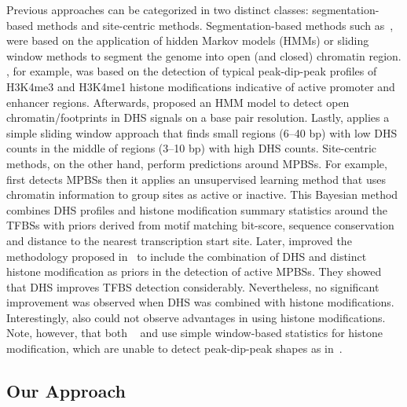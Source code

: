 \documentclass{bioinfo}
\begin{document}
Previous approaches can be categorized in two distinct classes: segmentation-based
methods and site-centric methods. Segmentation-based methods such as~\cite{boyle2011,neph2012a,won2010},
were based on the application of hidden Markov models (HMMs) or sliding window methods
to segment the genome into open (and {\color{red} closed}) chromatin region. \cite{won2010}, for
example, was based on the detection of typical peak-dip-peak profiles of H3K4me3
and H3K4me1 histone modifications indicative of active promoter and enhancer regions.
Afterwards, \cite{boyle2011} proposed an HMM model to detect open chromatin/footprints
in DHS signals on a base pair resolution. Lastly, \cite{neph2012a} applies a
simple sliding window approach that finds small regions (6--40 bp) with low DHS counts
in the middle of regions (3--10 bp) with high DHS counts. Site-centric methods, on
the other hand, perform predictions around MPBSs. For example,~\cite{pique2011}
first detects MPBSs then it applies an unsupervised learning method that uses chromatin
information to group sites as active or inactive. This Bayesian method combines DHS
profiles and histone modification summary statistics around the TFBSs with priors derived
from motif matching bit-score, sequence conservation and distance to the nearest transcription start site.
Later, \cite{cuellar2012} improved the methodology proposed in~\cite{whitington2009} to
include the combination of DHS and distinct histone modification as priors in the detection
of active MPBSs. They showed that DHS improves TFBS detection considerably. Nevertheless,
no significant improvement was observed when DHS was combined with histone modifications.
Interestingly, \cite{pique2011} also could not observe advantages in using histone
modifications. Note, however, that both ~\cite{pique2011} and \cite{cuellar2012} use simple
window-based statistics for histone modification, which are unable to detect peak-dip-peak
shapes as in~\cite{won2010}.

\subsection{Our Approach}
\label{sec:our.approach}
\end{document}
